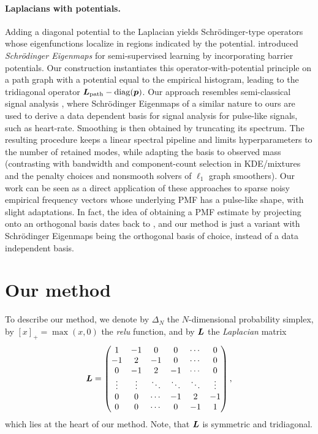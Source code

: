 \documentclass[10pt]{article} %
\DeclareMathOperator{\diag}{diag}
\begin{document}
\paragraph{Laplacians with potentials.} Adding a diagonal potential to the Laplacian yields Schr\"odinger-type operators whose eigenfunctions localize in regions indicated by the potential. \citet{CzajaEhler2013PAMI} introduced \emph{Schr\"odinger Eigenmaps} for semi-supervised learning by incorporating barrier potentials. Our construction instantiates this operator-with-potential principle on a path graph with a potential equal to the empirical histogram, leading to the tridiagonal operator $\mL_{\mathrm{path}} - \diag(\vp)$. Our approach resembles semi-classical signal analysis \citep{semiclassical}, where Schr\"odinger Eigenmaps of a similar nature to ours are used to derive a data dependent basis for signal analysis for pulse-like signals, such as heart-rate. Smoothing is then obtained by truncating its spectrum. The resulting procedure keeps a linear spectral pipeline and limits hyperparameters to the number of retained modes, while adapting the basis to observed mass (contrasting with bandwidth and component-count selection in KDE/mixtures and the penalty choices and nonsmooth solvers of $\ell_1$ graph smoothers). Our work can be seen as a direct application of these approaches to sparse noisy empirical frequency vectors whose underlying PMF has a pulse-like shape, with slight adaptations. In fact, the idea of obtaining a PMF estimate by projecting onto an orthogonal basis dates back to \citet{cencov1962estimation}, and our method is just a variant with Schr\"odinger Eigenmaps being the orthogonal basis of choice, instead of a data independent basis.

\section{Our method}\label{sec:method}
To describe our method, we denote by $\Delta_N$ the $N$-dimensional probability simplex, by $[x]_+ = \max(x, 0)$ the \emph{relu} function, and by ${\bm{L}}$ the \emph{Laplacian} matrix
\begin{equation}\label{eq:laplacian}
{\bm{L}} =\begin{pmatrix}
    1 & -1 & 0 & 0 & \cdots & 0 \\
    -1 & 2 & -1 & 0 & \cdots & 0 \\
    0 & -1 & 2 & -1 & \cdots & 0 \\
    \vdots & \vdots & \ddots & \ddots & \ddots & \vdots \\
    0 & 0 & \cdots & -1 & 2 & -1 \\
    0 & 0 & \cdots & 0 & -1 & 1
    \end{pmatrix},
\end{equation}
which lies at the heart of our method. Note, that ${\bm{L}}$ is symmetric and tridiagonal.
\end{document}
